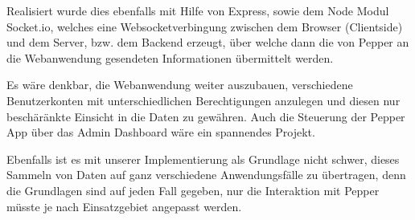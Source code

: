 Realisiert wurde dies ebenfalls mit Hilfe von Express, sowie dem Node Modul Socket.io, welches eine Websocketverbingung zwischen dem Browser (Clientside)
und dem Server, bzw. dem Backend erzeugt, über welche dann die von Pepper an die Webanwendung gesendeten Informationen übermittelt werden.


Es wäre denkbar, die Webanwendung weiter auszubauen, verschiedene Benutzerkonten mit unterschiedlichen Berechtigungen anzulegen und
diesen nur beschäränkte Einsicht in die Daten zu gewähren. Auch die Steuerung der Pepper App über das Admin Dashboard wäre
ein spannendes Projekt.

Ebenfalls ist es mit unserer Implementierung als Grundlage nicht schwer, dieses Sammeln von Daten auf ganz verschiedene Anwendungsfälle
zu übertragen, denn die Grundlagen sind auf jeden Fall gegeben, nur die Interaktion mit Pepper müsste je nach Einsatzgebiet
angepasst werden.